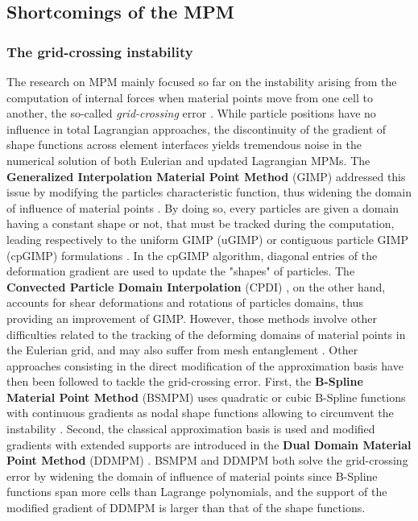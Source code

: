 \subsection{Shortcomings of the MPM}
\subsubsection*{The grid-crossing instability}
The research on MPM mainly focused so far on the instability arising from the computation of internal forces when material points move from one cell to another, the so-called \textit{grid-crossing} error \cite{Gimp}. While particle positions have no influence in total Lagrangian approaches, the discontinuity of the gradient of shape functions across element interfaces yields tremendous noise in the numerical solution of both Eulerian and updated Lagrangian MPMs. 
The \textbf{Generalized Interpolation Material Point Method} (GIMP) addressed this issue by modifying the particles characteristic function, thus widening the domain of influence of material points \cite{Gimp}. By doing so, every particles are given a domain having a constant shape or not, that must be tracked during the computation, leading respectively to the uniform GIMP (uGIMP) or contiguous particle GIMP (cpGIMP) formulations \cite{Book_MPM}. In the cpGIMP algorithm, diagonal entries of the deformation gradient are used to update the "shapes" of particles. The \textbf{Convected Particle Domain Interpolation} (CPDI) \cite{CPDI}, on the other hand, accounts for shear deformations and rotations of particles domains, thus providing an improvement of GIMP. However, those methods involve other difficulties related to the tracking of the deforming domains of material points in the Eulerian grid, and may also suffer from mesh entanglement \cite{DDMPM0}. Other approaches consisting in the direct modification of the approximation basis have then been followed to tackle the grid-crossing error. First, the \textbf{B-Spline Material Point Method} (BSMPM) \cite{Steffen_quadError} uses quadratic or cubic B-Spline functions with continuous gradients as nodal shape functions allowing to circumvent the instability \cite{MPM_BSpline1}. %
Second, the classical approximation basis is used and modified gradients with extended supports are introduced in the \textbf{Dual Domain Material Point Method} (DDMPM) \cite{DDMPM0}. BSMPM and DDMPM  both solve the grid-crossing error by widening the domain of influence of material points since B-Spline functions span more cells than Lagrange polynomials, and the support of the modified gradient of DDMPM is larger than that of the shape functions.

